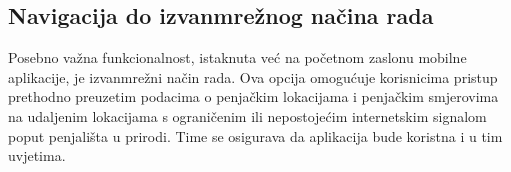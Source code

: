 \subsection{Navigacija do izvanmrežnog načina rada}


Posebno važna funkcionalnost, istaknuta već na početnom zaslonu mobilne aplikacije, je izvanmrežni način rada. Ova opcija omogućuje korisnicima pristup prethodno preuzetim podacima o penjačkim lokacijama i penjačkim smjerovima na udaljenim lokacijama s ograničenim ili nepostojećim internetskim signalom poput penjališta u prirodi. Time se osigurava da aplikacija bude koristna i u tim uvjetima.

